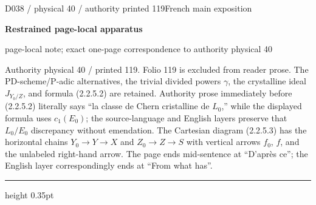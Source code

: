 \documentclass[9pt]{article}
\newcommand{\CanonText}[1]{\par{\fontsize{8.0}{9.35}\selectfont\RaggedRight #1\par}\vspace{2.2pt}}
\newcommand{\LayerTitle}{Restrained page-local apparatus}
\begin{document}
\noindent\begin{minipage}[t][\dimexpr\textheight-5pt\relax][t]{\textwidth}
{\sffamily\fontsize{7.3}{8.2}\selectfont\color{Quiet} D038 / physical 40 / authority printed 119\hfill French main exposition}
\par{}\vspace{4.5pt}
{\sffamily\fontsize{10.4}{11.6}\selectfont\bfseries\color{Accent} \LayerTitle}
\par{\sffamily\fontsize{6.7}{7.7}\selectfont\color{Quiet} page-local note; exact one-page correspondence to authority physical 40}
\vspace{5pt}
\CanonText{Authority physical 40 / printed 119. Folio 119 is excluded from reader prose. The PD-scheme/P-adic alternatives, the trivial divided powers \(\gamma{}\), the crystalline ideal \(J_{Y_{0}/Z}\), and formula (2.2.5.2) are retained. Authority prose immediately before (2.2.5.2) literally says “la classe de Chern cristalline de \(L_{0}\),” while the displayed formula uses \(c_{1}(E_{0})\); the source-language and English layers preserve that \(L_{0}/E_{0}\) discrepancy without emendation. The Cartesian diagram (2.2.5.3) has the horizontal chains \(Y_{0}\to{}Y\to{}X\) and \(Z_{0}\to{}Z\to{}S\) with vertical arrows \(f_{0}\), \(f\), and the unlabeled right-hand arrow. The page ends mid-sentence at “D'après ce”; the English layer correspondingly ends at “From what has”.}
\vfill
{\color{Accent}\hrule height 0.35pt}\vspace{3pt}
\end{minipage}
\newpage
\end{document}
